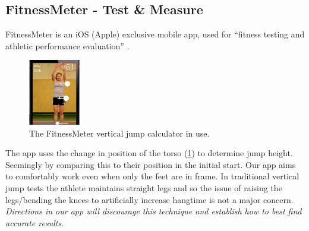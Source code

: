 \subsection{FitnessMeter - Test \& Measure}
\label{research:fitness-meter}
FitnessMeter is an iOS (Apple) exclusive mobile app, used for 
``fitness testing and athletic performance evaluation'' \cite{fitness-meter}.
\begin{figure}[H]
	\centering
	\includegraphics[width=0.2\textwidth]{graphics/fitnessmeter/jumpcalc.jpg}
	\caption{The FitnessMeter vertical jump calculator in use.}
	\label{fig:fitnessmeter-jump}	
\end{figure}
\vspace{-5mm} 
The app uses the change in position of the torso (\cref{fig:fitnessmeter-jump}) to determine jump height. Seemingly by comparing this to their position
in the initial start. Our app aims to comfortably work even when only the feet are in frame. In traditional vertical jump 
tests the athlete maintains straight legs and so the issue of raising the legs/bending the knees to artificially increase
hangtime is not a major concern. \textit{Directions in our app will discourage this technique and establish how to best
find accurate results.}

